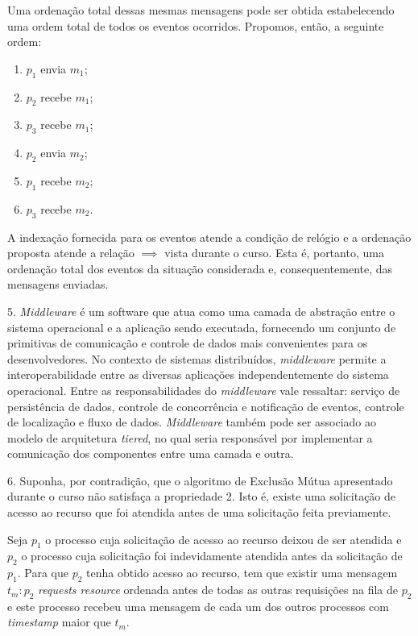 \documentclass[a4paper]{article}
\begin{document}
Uma ordenação total dessas mesmas mensagens pode ser obtida estabelecendo uma ordem total de todos os eventos ocorridos.
Propomos, então, a seguinte ordem:

\begin{enumerate}
  \item $p_1$ envia $m_1$;
  \item $p_2$ recebe $m_1$;
  \item $p_3$ recebe $m_1$;
  \item $p_2$ envia $m_2$;
  \item $p_1$ recebe $m_2$;
  \item $p_3$ recebe $m_2$.
\end{enumerate}

A indexação fornecida para os eventos atende a condição de relógio e a ordenação proposta atende a relação $\implies$ vista durante o curso.
Esta é, portanto, uma ordenação total dos eventos da situação considerada e, consequentemente, das mensagens enviadas.

\bigskip


5. \textit{Middleware} é um software que atua como uma camada de abstração entre o sistema operacional e a aplicação sendo executada, fornecendo um conjunto de primitivas de comunicação e controle de dados mais convenientes para os desenvolvedores.
No contexto de sistemas distribuídos, \textit{middleware} permite a interoperabilidade entre as diversas aplicações independentemente do sistema operacional.
Entre as responsabilidades do \textit{middleware} vale ressaltar: serviço de persistência de dados, controle de concorrência e notificação de eventos, controle de localização e fluxo de dados.
\textit{Middleware} também pode ser associado ao modelo de arquitetura \textit{tiered}, no qual seria responsável por implementar a comunicação dos componentes entre uma camada e outra.
 
\bigskip


6. Suponha, por contradição, que o algoritmo de Exclusão Mútua apresentado durante o curso não satisfaça a propriedade 2.
Isto é, existe uma solicitação de acesso ao recurso que foi atendida antes de uma solicitação feita previamente.

Seja $p_1$ o processo cuja solicitação de acesso ao recurso deixou de ser atendida e $p_2$ o processo cuja solicitação foi indevidamente atendida antes da solicitação de $p_1$.
Para que $p_2$ tenha obtido acesso ao recurso, tem que existir uma mensagem $t_m : p_2$ \textit{requests resource} ordenada antes de todas as outras requisições na fila de $p_2$ e este processo recebeu uma mensagem de cada um dos outros processos com \textit{timestamp} maior que $t_m$.
\end{document}
